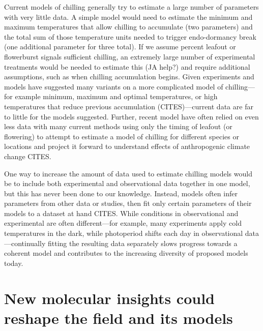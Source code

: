 \documentclass[11pt]{article}
\begin{document}
Current models of chilling generally try to estimate a large number of parameters with very little data. A simple model would need to estimate the minimum and maximum temperatures that allow chilling to accumulate (two parameters) and the total sum of those temperature units needed to trigger endo-dormancy break (one additional parameter for three total). If we assume percent leafout or flowerburst signals sufficient chilling, an extremely large number of experimental treatments would be needed to estimate this (JA help?) and require additional assumptions, such as when chilling accumulation begins. Given experiments and models have suggested many variants on a more complicated model of chilling---for example minimum, maximum and optimal temperatures, or high temperatures that reduce previous accumulation (CITES)---current data are far to little for the models suggested. Further, recent model have often relied on even less data with many current methods using only the timing of leafout (or flowering) to attempt to estimate a model of chilling for different species or locations and project it forward to understand effects of anthropogenic climate change CITES. %

One way to increase the amount of data used to estimate chilling models would be to include both experimental and observational data together in one model, but this has never been done to our knowledge. Instead, models often infer parameters from other data or studies, then fit only certain parameters of their models to a dataset at hand CITES. While conditions in observational and experimental are often different---for example, many experiments apply cold temperatures in the dark, while photoperiod shifts each day in observational data---continually fitting the resulting data separately slows progress towards a coherent model and contributes to the increasing diversity of proposed models today. 

\section*{New molecular insights could reshape the field and its models} %
\end{document}
